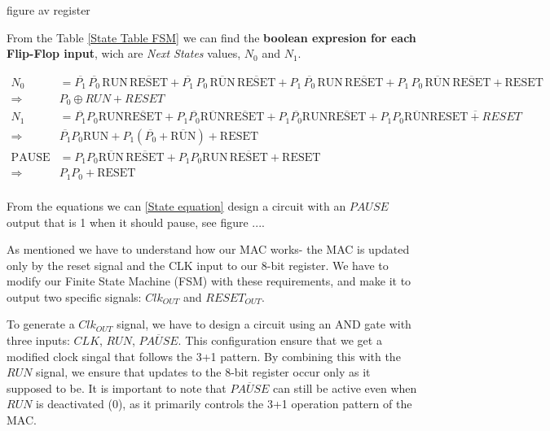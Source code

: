 figure av register

From the Table \ref{State Table FSM} we can find the \textbf{boolean expresion for each Flip-Flop input}, wich are \emph{Next States} values, $N_{0}$ and $N_{1}$. 

\begin{equation} 
    \label{State equation}
    \begin{aligned}
    N_{0}&= \overline{P_{1}} \, \overline{P_{0}} \, \text{RUN} \, \overline{\text{RESET}} + \overline{P_{1}} \, P_{0} \, \overline{\text{RUN}} \, \overline{\text{RESET}} + P_{1} \, \overline{P_{0}} \, \text{RUN} \, \overline{\text{RESET}} + P_{1} \, P_{0} \, \overline{\text{RUN}} \, \overline{\text{RESET}} + \text{RESET}\\
    \Rightarrow&P_{0}\oplus RUN+ RESET\\
    N_{1}&= \overline{P_{1}} P_{0} \text{RUN} \overline{\text{RESET}} + P_{1} \overline{P_{0}} \overline{\text{RUN}} \overline{\text{RESET}} + P_{1} \overline{P_{0}} \text{RUN} \overline{\text{RESET}} + P_{1} P_{0} \overline{\text{RUN}} \overline{\text{RESET}+ RESET}\\
    \Rightarrow&\overline{P_{1}} P_{0} \text{RUN} + P_{1}(\overline{P_{0}} + \overline{\text{RUN}}) + \text{RESET}\\
    \text{PAUSE}&= P_{1} P_{0} \overline{\text{RUN}} \, \overline{\text{RESET}} + P_{1} P_{0} \text{RUN} \, \overline{\text{RESET}} + \text{RESET}\\
    \Rightarrow&P_{1} P_{0}+\text{RESET}\\
    \end{aligned}
\end{equation}

From the equations we can \ref{State equation} design a circuit with an $PAUSE$ output that is 1 when it should pause,  see figure ....



As mentioned we have to understand how our MAC works- the MAC is updated only by the reset signal and the CLK input to our 8-bit register. We have to modify our Finite State Machine (FSM) with these requirements, and make it to output two specific signals: $Clk_{OUT}$ and $RESET_{OUT}$. 

To generate a $Clk_{OUT}$ signal, we have to design a circuit using an AND gate with three inputs: $CLK$, $RUN$, $\overline{PAUSE}$. This configuration  ensure that we get a  modified clock singal that follows the 3+1 pattern. By combining this with the $RUN$ signal, we ensure that updates to the 8-bit register occur only as it supposed to be. It is important to note that $\overline{PAUSE}$ can still be active even when $RUN$ is deactivated (0), as it primarily controls the 3+1 operation pattern of the MAC. 


